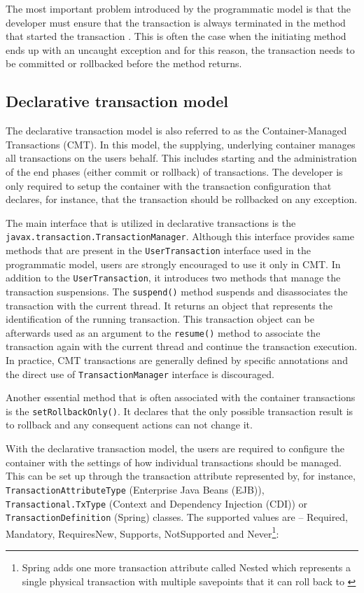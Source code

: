 \documentclass[oneside,
  digital, %
  table,   %
  nolof,     %
  nolot,     %
]{fithesis3}
\begin{document}
The most important problem introduced by the programmatic model is that the developer must ensure that the transaction is always terminated in the method that started the transaction \cite{java_transaction_design_strategies}. This is often the case when  the initiating method ends up with an uncaught exception and for this reason, the transaction needs to be committed or rollbacked before the method returns.

\subsection{Declarative transaction model}
\label{sec:decl-tran-model}

The declarative transaction model is also referred to as the Container-Managed Transactions (CMT). In this model, the supplying, underlying container manages all transactions on the users behalf. This includes starting and the administration of the end phases (either commit or rollback) of transactions. The developer is only required to setup the container with the transaction configuration that declares, for instance, that the transaction should be rollbacked on any exception.

The main interface that is utilized in declarative transactions is the \texttt{javax.transaction.TransactionManager}. Although this interface provides  same methods that are present in the \texttt{UserTransaction} interface used in the programmatic model, users are strongly encouraged to use it only in CMT. In addition to the \texttt{UserTransaction}, it introduces two methods that manage the transaction suspensions. The \texttt{suspend()} method suspends and  disassociates the transaction with the current thread. It returns an object that represents the identification of the running transaction. This transaction object can be afterwards used as an argument to the \texttt{resume()} method to associate the transaction again with the current thread and continue the transaction execution. In practice, CMT transactions are generally defined by specific annotations and the direct use of \texttt{TransactionManager} interface is discouraged.

Another essential method that is often associated with the container transactions is the \texttt{setRollbackOnly()}. It declares that the only possible transaction result is to rollback and any consequent actions can not change it.

With the declarative transaction model, the users are required to configure the container with the settings of how individual transactions should be managed. This can be set up through the transaction attribute represented by, for instance, \texttt{TransactionAttributeType} (Enterprise Java Beans (EJB)), \texttt{Transactional.TxType} (Context and Dependency Injection (CDI)) or \texttt{TransactionDefinition} (Spring) classes. The supported values are -- Required, Mandatory, RequiresNew, Supports, NotSupported and Never\footnote{Spring adds one more transaction attribute called Nested which represents a single physical transaction with multiple savepoints that it can roll back to \cite{spring_transaction_management_documentation}}:
\end{document}
